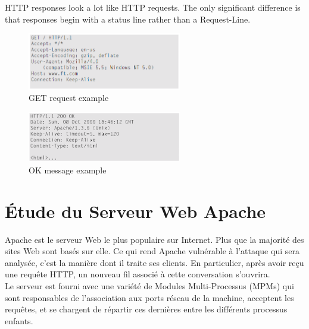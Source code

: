 \documentclass{article}
\begin{document}
\noindent
HTTP responses look a lot like HTTP requests. The only significant difference is that responses begin with a status line rather than a Request-Line.

\begin{figure}[H]
	\begin{center}
		\includegraphics[width=0.6\textwidth]{images/getRequest.png} %
		\caption{GET request example}
	\end{center}
\end{figure}

\begin{figure}[H]
	\begin{center}
		\includegraphics[width=0.6\textwidth]{images/ok.png} %
		\caption{OK message example}
	\end{center}
\end{figure}

\section{Étude du Serveur Web Apache}
Apache est le serveur Web le plus populaire sur Internet. Plus que la majorité des sites Web sont basés sur elle. Ce qui rend Apache vulnérable à l'attaque qui sera analysée, c'est la manière dont il traite ses clients. En particulier, après avoir reçu une requête HTTP, un nouveau fil associé à cette conversation s'ouvrira. \\
Le serveur est fourni avec une variété de Modules Multi-Processus (MPMs) qui sont responsables de l'association aux ports réseau de la machine, acceptent les requêtes, et se chargent de répartir ces dernières entre les différents processus enfants. \\

\end{document}
